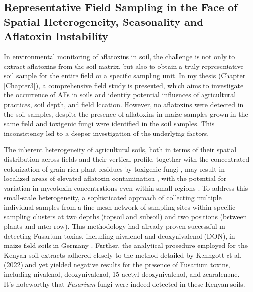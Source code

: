 \subsection{Representative Field Sampling in the Face of Spatial Heterogeneity, Seasonality and Aflatoxin Instability} 

In environmental monitoring of aflatoxins in soil, the challenge is not only to extract aflatoxins from the soil matrix, but also to obtain a truly representative soil sample for the entire field or a specific sampling unit. In my thesis (Chapter \ref{Chapter3}), a comprehensive field study is presented, which aims to investigate the occurrence of AFs in soils and identify potential influences of agricultural practices, soil depth, and field location. However, no aflatoxins were detected in the soil samples, despite the presence of aflatoxins in maize samples grown in the same field and toxigenic fungi were identified in the soil samples. This inconsistency led to a deeper investigation of the underlying factors. 


The inherent heterogeneity of agricultural soils, both in terms of their spatial distribution across fields and their vertical profile, together with the concentrated colonization of grain-rich plant residues by toxigenic fungi \citep{horn2003ecology}, may result in localized areas of elevated aflatoxin contamination \citep{accinelli2008aspergillus}, with the potential for variation in mycotoxin concentrations even within small regions \citep{kenngott2022fusarium}. To address this small-scale heterogeneity, a sophisticated approach of collecting multiple individual samples from a fine-mesh network of sampling sites within specific sampling clusters at two depths (topsoil and subsoil) and two positions (between plants and inter-row). This methodology had already proven successful in detecting Fusarium toxins, including nivalenol and deoxynivalenol (DON), in maize field soils in Germany \citep{kenngott2022fusarium}. Further, the analytical procedure employed for the Kenyan soil extracts adhered closely to the method detailed by Kenngott et al. (2022) and yet yielded negative results for the presence of Fusarium toxins, including nivalenol, deoxynivalenol, 15-acetyl-deoxynivalenol, and zearalenone.  It's noteworthy that \textit{Fusarium} fungi were indeed detected in these Kenyan soils. 



